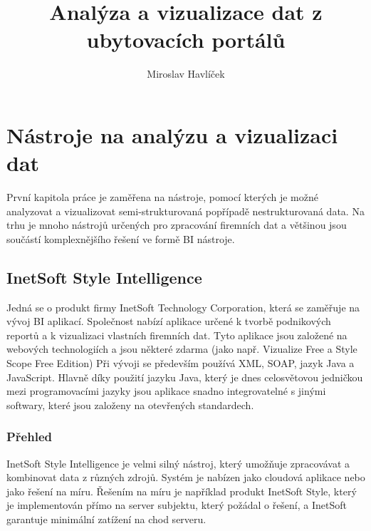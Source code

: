 \documentclass[czech,BP]{thesiskiv2}
\author{Miroslav Havlíček}
\title{Analýza a vizualizace dat z ubytovacích portálů}
\begin{document}
%
\maketitle
\tableofcontents

\chapter{Nástroje na analýzu a vizualizaci dat }

První kapitola práce je zaměřena na nástroje, pomocí kterých je možné analyzovat a vizualizovat semi-strukturovaná popřípadě nestrukturovaná data. Na trhu je mnoho nástrojů určených pro zpracování firemních dat a většinou jsou součástí komplexnějšího řešení ve formě BI nástroje.

\section{InetSoft Style Intelligence}
Jedná se o produkt firmy InetSoft Technology Corporation, která  se zaměřuje na vývoj BI aplikací. Společnost nabízí aplikace určené k tvorbě podnikových reportů a k vizualizaci vlastních firemních dat. Tyto aplikace jsou založené na webových technologiích a jsou některé zdarma (jako např. Vizualize Free a Style Scope Free Edition) Při vývoji se především používá XML, SOAP, jazyk Java a JavaScript\cite{InetTechnology}. Hlavně díky použití jazyku Java, který je dnes celosvětovou jedničkou mezi programovacími jazyky \cite{JavaStandings} jsou aplikace snadno integrovatelné s jinými softwary, které jsou založeny na otevřených standardech. 

\subsection{Přehled}
InetSoft Style Intelligence je velmi silný nástroj, který umožňuje zpracovávat a kombinovat data z různých zdrojů. Systém je nabízen jako cloudová aplikace nebo jako řešení na míru. Řešením na míru je například produkt InetSoft Style, který je implementován přímo na server subjektu, který požádal o řešení, a InetSoft garantuje minimální zatížení na chod serveru.
\end{document}
